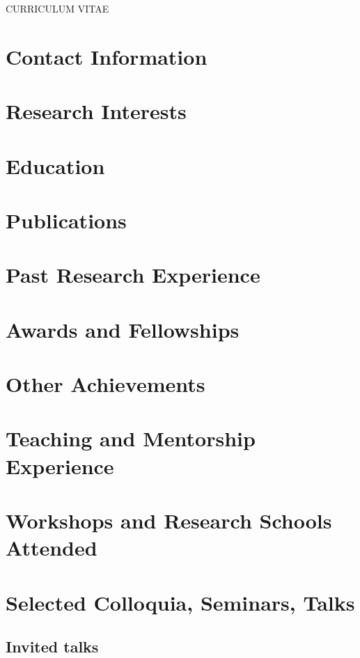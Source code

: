 \documentclass[margin,line]{res}
\begin{document}
\centerline{\Large CURRICULUM VITAE}


\begin{resume}
\section{\sc Contact Information}
    
\section{\sc Research Interests}
    
\section{\sc Education}
    
\section{\sc Publications}
    
\section{\sc Past Research Experience}
    
\section{\sc Awards and Fellowships}
    
\section{\sc Other Achievements}
    
\section{\sc Teaching and Mentorship Experience}
    
\section{\sc Workshops and Research Schools Attended}
    
\section{\sc Selected Colloquia, Seminars, Talks}
    
    \subsection{\sc Invited talks}
        

\end{resume}
\end{document}
